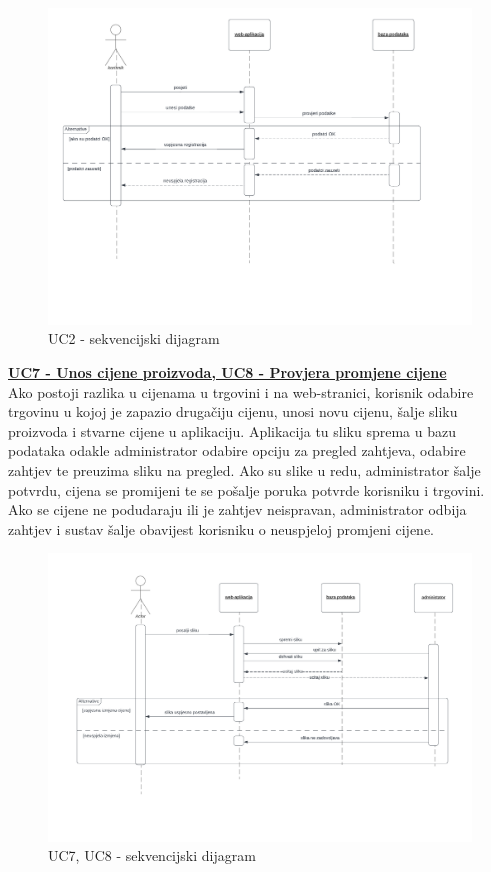 			\begin{figure}[H]
			\includegraphics[width=\textwidth]{slike/uc2.PNG} %
			\caption{UC2 - sekvencijski dijagram}
			\label{fig:promjene2} %
			\end{figure}
				
				\underline{\textbf{UC7 - Unos cijene proizvoda, UC8 - Provjera promjene cijene}}\\
				
				Ako postoji razlika u cijenama u trgovini i na web-stranici, korisnik odabire trgovinu u kojoj je zapazio drugačiju cijenu, unosi novu cijenu, šalje sliku proizvoda i stvarne cijene u aplikaciju. Aplikacija tu sliku sprema u bazu podataka odakle administrator odabire opciju za pregled zahtjeva, odabire zahtjev te preuzima sliku na pregled. Ako su slike u redu, administrator šalje potvrdu, cijena se promijeni te se pošalje poruka potvrde korisniku i trgovini. Ako se cijene ne podudaraju ili je zahtjev neispravan, administrator odbija zahtjev i sustav šalje obavijest korisniku o neuspjeloj promjeni cijene.
				
				\begin{figure}[H]
			\includegraphics[width=\textwidth]{slike/uc7_cropped.PNG} %
			\caption{UC7, UC8 - sekvencijski dijagram}
			\label{fig:promjene2} %
			\end{figure}
			
